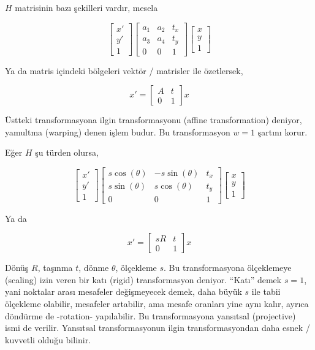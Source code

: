 \documentclass[12pt,fleqn]{article}\usepackage{../../common}
\begin{document}
$H$ matrisinin bazı şekilleri vardır, mesela 

$$ 
\left[\begin{array}{r} x' \\ y' \\ 1 \end{array}\right]
\left[\begin{array}{rrr}
a_1 & a_2 & t_x \\ a_3 & a_4 & t_y \\ 0 & 0 & 1
\end{array}\right]
\left[\begin{array}{r} x \\ y \\ 1 \end{array}\right]
$$

Ya da matris içindeki bölgeleri vektör / matrisler ile özetlersek,

$$ 
x' = \left[\begin{array}{rr} A & t \\ 0 & 1 \end{array}\right] x
$$

Üstteki transformasyona ilgin transformasyonu (affine transformation)
deniyor, yamultma (warping) denen işlem budur. Bu transformasyon $w=1$
şartını korur.

Eğer $H$ şu türden olursa,

$$ 
\left[\begin{array}{r} x' \\ y' \\ 1 \end{array}\right]
\left[\begin{array}{rrr}
s\cos(\theta) & -s\sin(\theta) & t_x \\ 
s\sin(\theta) & s\cos(\theta) & t_y \\ 
0 & 0 & 1
\end{array}\right]
\left[\begin{array}{r} x \\ y \\ 1 \end{array}\right]
$$

Ya da 

$$ 
x' = \left[\begin{array}{rr}
sR & t \\ 0 & 1
\end{array}\right] x
$$

Dönüş $R$, taşınma $t$, dönme $\theta$, ölçekleme $s$. Bu transformasyona
ölçeklemeye (scaling) izin veren bir katı (rigid) transformasyon
deniyor. ``Katı'' demek $s=1$, yani noktalar arası mesafeler değişmeyecek
demek, daha büyük $s$ ile tabii ölçekleme olabilir, mesafeler artabilir,
ama mesafe oranları yine aynı kalır, ayrıca döndürme de -rotation-
yapılabilir. Bu transformasyona yansıtsal (projective) ismi de
verilir. Yansıtsal transformasyonun ilgin transformasyondan daha esnek /
kuvvetli olduğu bilinir.
\end{document}
